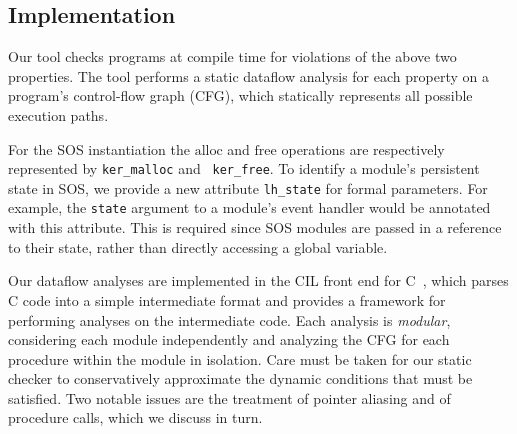 % 
% 
% 


\subsection{Implementation}


Our tool checks programs at compile time for violations of the above
two properties.  The tool performs a static dataflow analysis for each
property on a program's control-flow graph (CFG), which statically
represents all possible execution paths.  

For the SOS instantiation the $\mathrm{alloc}$ and $\mathrm{free}$
operations are respectively represented by {\tt ker\_malloc} and {\tt
ker\_free}.  To identify a module's persistent state in SOS, we
provide a new attribute {\tt lh\_state} for formal parameters.  For
example, the {\tt state} argument to a module's event handler would be
annotated with this attribute.  This is required since SOS modules are
passed in a reference to their state, rather than directly accessing a
global variable.

Our dataflow analyses are implemented in the CIL front end for
C~\cite{CIL}, which parses C code into a simple intermediate format
and provides a framework for performing analyses on the intermediate
code.  Each analysis is {\em modular}, considering each module
independently and analyzing the CFG for each procedure within the
module in isolation.  Care must be taken for our static checker to
conservatively approximate the dynamic conditions that must be
satisfied.  Two notable issues are the treatment of pointer aliasing
and of procedure calls, which we discuss in turn.

